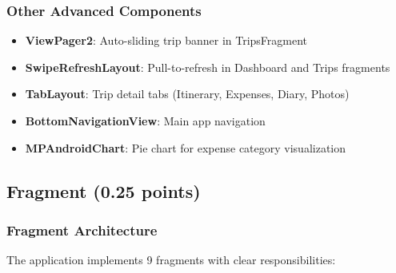 \documentclass[12pt,a4paper]{article}
\begin{document}
\subsubsection{Other Advanced Components}
\begin{itemize}
    \item \textbf{ViewPager2}: Auto-sliding trip banner in TripsFragment
    \item \textbf{SwipeRefreshLayout}: Pull-to-refresh in Dashboard and Trips fragments
    \item \textbf{TabLayout}: Trip detail tabs (Itinerary, Expenses, Diary, Photos)
    \item \textbf{BottomNavigationView}: Main app navigation
    \item \textbf{MPAndroidChart}: Pie chart for expense category visualization
\end{itemize}

\subsection{Fragment (0.25 points)}

\subsubsection{Fragment Architecture}
The application implements 9 fragments with clear responsibilities:
\end{document}
